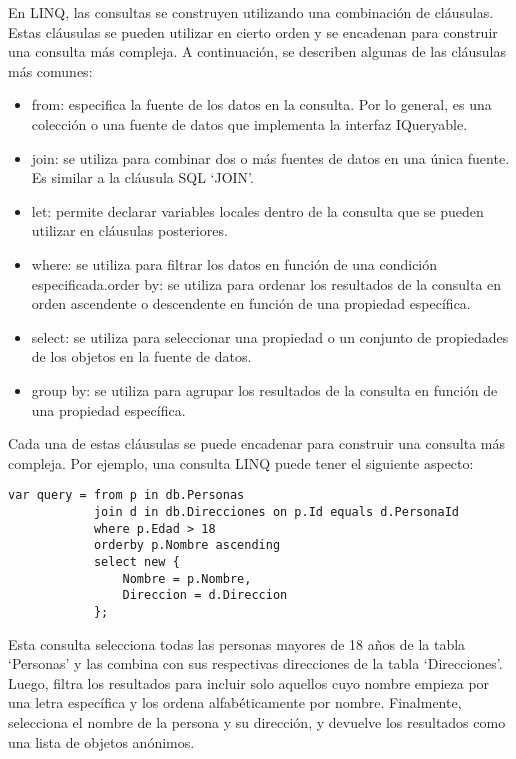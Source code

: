 \documentclass[executivepaper]{article}
\begin{document}
En LINQ, las consultas se construyen utilizando una combinación de cláusulas. Estas cláusulas se pueden utilizar en cierto orden y se encadenan para construir una consulta más compleja. A continuación, se describen algunas de las cláusulas más comunes:

\begin{itemize}
    \item from: especifica la fuente de los datos en la consulta. Por lo general, es una colección o una fuente de datos que implementa la interfaz IQueryable.
    \item join: se utiliza para combinar dos o más fuentes de datos en una única fuente. Es similar a la cláusula SQL \enquote*{JOIN}.
    \item let: permite declarar variables locales dentro de la consulta que se pueden utilizar en cláusulas posteriores.
    \item where: se utiliza para filtrar los datos en función de una condición especificada.order by: se utiliza para ordenar los resultados de la consulta en orden ascendente o descendente en función de una propiedad específica.
    \item select: se utiliza para seleccionar una propiedad o un conjunto de propiedades de los objetos en la fuente de datos.
    \item group by: se utiliza para agrupar los resultados de la consulta en función de una propiedad específica.
\end{itemize}

Cada una de estas cláusulas se puede encadenar para construir una consulta más compleja. Por ejemplo, una consulta LINQ puede tener el siguiente aspecto:
\begin{lstlisting}
var query = from p in db.Personas
            join d in db.Direcciones on p.Id equals d.PersonaId
            where p.Edad > 18
            orderby p.Nombre ascending
            select new {
                Nombre = p.Nombre,
                Direccion = d.Direccion
            };    
\end{lstlisting}

Esta consulta selecciona todas las personas mayores de 18 años de la tabla \enquote*{Personas} y las combina con sus respectivas direcciones de la tabla \enquote*{Direcciones}. Luego, filtra los resultados para incluir solo aquellos cuyo nombre empieza por una letra específica y los ordena alfabéticamente por nombre. Finalmente, selecciona el nombre de la persona y su dirección, y devuelve los resultados como una lista de objetos anónimos.
\end{document}
